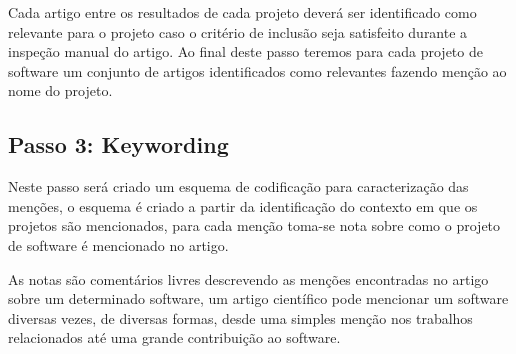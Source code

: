 

Cada artigo entre os resultados de cada projeto deverá ser identificado como
relevante para o projeto caso o critério de inclusão seja satisfeito durante a
inspeção manual do artigo. Ao final deste passo teremos para cada projeto
de software um conjunto de artigos identificados como relevantes fazendo
menção ao nome do projeto.




\subsection{Passo 3: Keywording}


Neste passo será criado um esquema de codificação para caracterização das
menções, o esquema é criado a partir da identificação do contexto em que os
projetos são mencionados, para cada menção toma-se nota sobre como o projeto de
software é mencionado no artigo.

As notas são comentários livres descrevendo as menções encontradas no artigo
sobre um determinado software, um artigo científico pode mencionar um software
diversas vezes, de diversas formas, desde uma simples menção nos trabalhos
relacionados até uma grande contribuição ao software.

